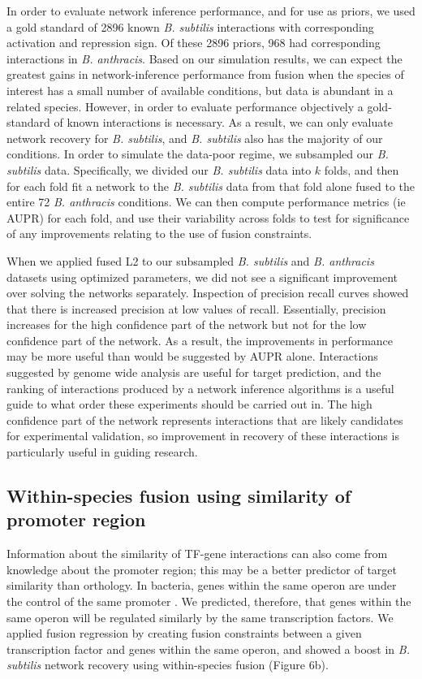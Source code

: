 \documentclass[11pt]{article}
\begin{document}
In order to evaluate network inference performance, and for use as priors, we used a gold standard of 2896 known \textit{B. subtilis} interactions with corresponding activation and repression sign. Of these 2896 priors, 968 had corresponding interactions in \textit{B. anthracis}. Based on our simulation results, we can expect the greatest gains in network-inference performance from fusion when the species of interest has a small number of available conditions, but data is abundant in a related species. However, in order to evaluate performance objectively a gold-standard of known interactions is necessary. As a result, we can only evaluate network recovery for \textit{B. subtilis}, and \textit{B. subtilis} also has the majority of our conditions. In order to simulate the data-poor regime, we subsampled our \textit{B. subtilis} data. Specifically, we divided our \textit{B. subtilis} data into $k$ folds, and then for each fold fit a network to the \textit{B. subtilis} data from that fold alone fused to the entire 72 \textit{B. anthracis} conditions. We can then compute performance metrics (ie AUPR) for each fold, and use their variability across folds to test for significance of any improvements relating to the use of fusion constraints. 

When we applied fused L2 to our subsampled \textit{B. subtilis} and \textit{B. anthracis} datasets using optimized parameters, we did not see a significant improvement over solving the networks separately. Inspection of precision recall curves showed that there is increased precision at low values of recall. Essentially, precision increases for the high confidence part of the network but not for the low confidence part of the network. As a result, the improvements in performance may be more useful than would be suggested by AUPR alone. Interactions suggested by genome wide analysis are useful for target prediction, and the ranking of interactions produced by a network inference algorithms is a useful guide to what order these experiments should be carried out in. The high confidence part of the network represents interactions that are likely candidates for experimental validation, so improvement in recovery of these interactions is particularly useful in guiding research. 

\subsection{Within-species fusion using similarity of promoter region}
Information about the similarity of TF-gene interactions can also come from knowledge about the promoter region; this may be a better predictor of target similarity than orthology. In bacteria, genes within the same operon are under the control of the same promoter \cite{lawrence_shared_2002}. We predicted, therefore, that genes within the same operon will be regulated similarly by the same transcription factors. We applied fusion regression by creating fusion constraints between a given transcription factor and genes within the same operon, and showed a boost in \textit{B. subtilis} network recovery using within-species fusion (Figure 6b). 
\end{document}
